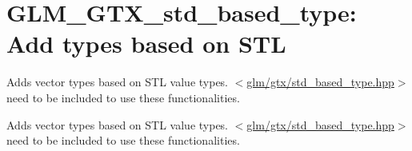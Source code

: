 \hypertarget{group__gtx__std__based__type}{\section{\-G\-L\-M\-\_\-\-G\-T\-X\-\_\-std\-\_\-based\-\_\-type\-: \-Add types based on \-S\-T\-L}
\label{group__gtx__std__based__type}
}


\-Adds vector types based on \-S\-T\-L value types. $<$\hyperlink{std__based__type_8hpp}{glm/gtx/std\-\_\-based\-\_\-type.\-hpp}$>$ need to be included to use these functionalities.  


\-Adds vector types based on \-S\-T\-L value types. $<$\hyperlink{std__based__type_8hpp}{glm/gtx/std\-\_\-based\-\_\-type.\-hpp}$>$ need to be included to use these functionalities. 
